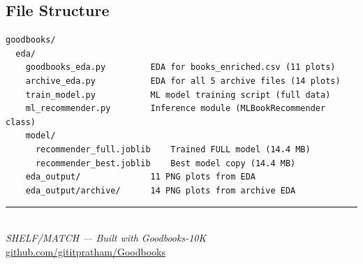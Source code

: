 \documentclass[12pt, a4paper]{article}
\begin{document}
\subsection{File Structure}

\begin{verbatim}
goodbooks/
  eda/
    goodbooks_eda.py         EDA for books_enriched.csv (11 plots)
    archive_eda.py           EDA for all 5 archive files (14 plots)
    train_model.py           ML model training script (full data)
    ml_recommender.py        Inference module (MLBookRecommender class)
    model/
      recommender_full.joblib    Trained FULL model (14.4 MB)
      recommender_best.joblib    Best model copy (14.4 MB)
    eda_output/              11 PNG plots from EDA
    eda_output/archive/      14 PNG plots from archive EDA
\end{verbatim}

\vspace{1cm}
\begin{center}
{\color{shelfBlue}\rule{0.5\textwidth}{2pt}}\\[0.4em]
\small\textit{SHELF/MATCH — Built with Goodbooks-10K}\\
\href{https://github.com/gititpratham/Goodbooks}{github.com/gititpratham/Goodbooks}
\end{center}
\end{document}
